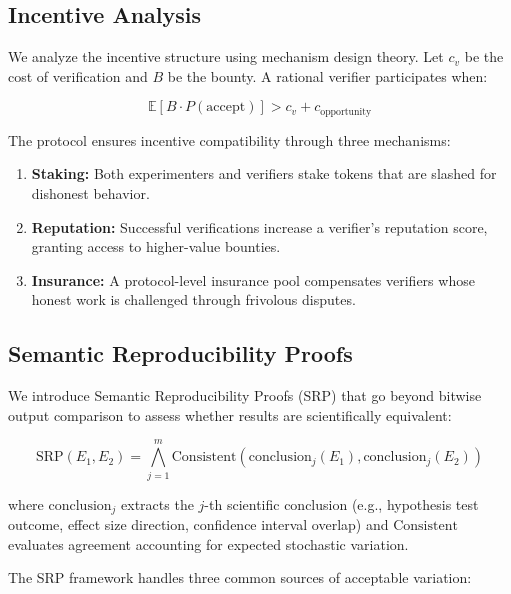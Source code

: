 \subsection{Incentive Analysis}

We analyze the incentive structure using mechanism design theory.
Let $c_v$ be the cost of verification and $B$ be the bounty.
A rational verifier participates when:

\begin{equation}
    \mathbb{E}[B \cdot P(\text{accept})] > c_v + c_{\text{opportunity}}
\end{equation}

The protocol ensures incentive compatibility through three mechanisms:

\begin{enumerate}[leftmargin=*]
    \item \textbf{Staking:} Both experimenters and verifiers stake tokens that are slashed for dishonest behavior.
    \item \textbf{Reputation:} Successful verifications increase a verifier's reputation score, granting access to higher-value bounties.
    \item \textbf{Insurance:} A protocol-level insurance pool compensates verifiers whose honest work is challenged through frivolous disputes.
\end{enumerate}

\subsection{Semantic Reproducibility Proofs}

We introduce Semantic Reproducibility Proofs (SRP) that go beyond bitwise output comparison to assess whether results are scientifically equivalent:

\begin{equation}
    \text{SRP}(E_1, E_2) = \bigwedge_{j=1}^{m} \text{Consistent}(\text{conclusion}_j(E_1), \text{conclusion}_j(E_2))
\end{equation}

\noindent where $\text{conclusion}_j$ extracts the $j$-th scientific conclusion (e.g., hypothesis test outcome, effect size direction, confidence interval overlap) and $\text{Consistent}$ evaluates agreement accounting for expected stochastic variation.

The SRP framework handles three common sources of acceptable variation:

